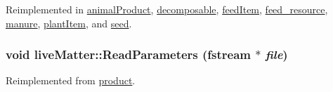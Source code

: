 Reimplemented in \hyperlink{classanimal_product_a4d2a737f963def9fec349b7f49e85d7c}{animalProduct}, \hyperlink{classdecomposable_a296f63c98dd6712bfc375287c6123ea7}{decomposable}, \hyperlink{classfeed_item_aff5b258f8da3b96282898cb9fa685c2f}{feedItem}, \hyperlink{classfeed__resource_af85c55e18f378ff9f64c962450237989}{feed\_\-resource}, \hyperlink{classmanure_aefa4f7856537616586ae73e8a34cdf97}{manure}, \hyperlink{classplant_item_a8f1788f9c6299d63ad1fa4add42c0fe2}{plantItem}, and \hyperlink{classseed_af52e1504b4da971919e451f53fa0802f}{seed}.\hypertarget{classlive_matter_acaf1db5a1bb2fc9beb79002771f0282c}{
\subsubsection[{ReadParameters}]{\setlength{\rightskip}{0pt plus 5cm}void liveMatter::ReadParameters (fstream $\ast$ {\em file})}}
\label{classlive_matter_acaf1db5a1bb2fc9beb79002771f0282c}


Reimplemented from \hyperlink{classproduct_a1edb3e3d0619a2db8b8f1c95fed582ce}{product}.

